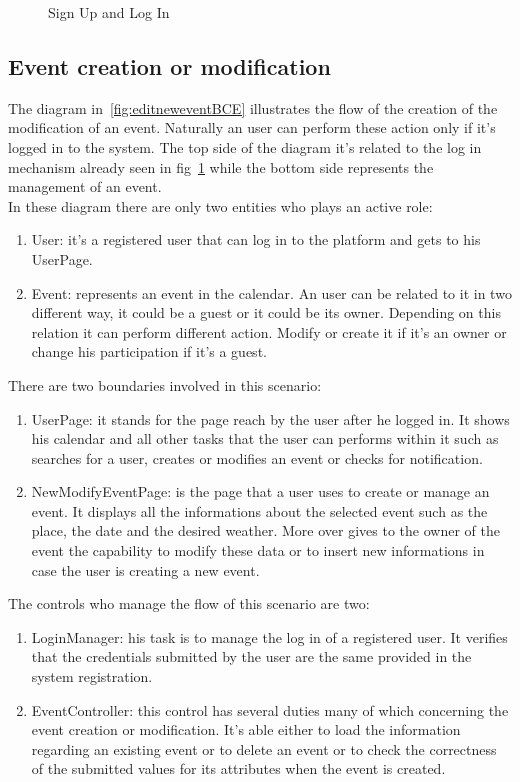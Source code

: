 \begin{itemize}
\begin{center}
\begin{figure}[H]
    \caption{Sign Up and Log In}
     \label{fig:logBCE}
     \end{figure}
   \end{center}  
\end{itemize}

\subsection{Event creation or modification}
The diagram in~\ref{fig:editneweventBCE} illustrates the flow of the creation of the modification of an event. Naturally an user can perform   these action only if it's logged in to the system. The top side of the diagram it's related to the log in mechanism already seen in fig~\ref{fig:logBCE} while the bottom side represents the management of an event. 
\\In these diagram there are only two entities who plays an active role:
\begin{enumerate}
\item User: it's a registered user that can log in to the platform and gets to his UserPage.
\item Event: represents an event in the calendar. An user can be related to it in two different way, it could be a guest or it could be its owner. Depending on this relation it can perform different action. Modify or create it if it's an owner or change his participation if it's a guest.\end{enumerate}
There are two boundaries involved in this scenario: \begin{enumerate}
\item UserPage: it stands for the page reach by the user after he logged in. It shows his calendar and all other tasks that the user can performs within it such as searches for a user, creates or modifies an event or checks for notification.
\item NewModifyEventPage: is the page that a user uses to create or manage an event. It displays all the informations about the selected event such as the place, the date and the desired weather. More over gives to the owner of the event the capability to modify these data or to insert new informations in case the user is creating a new event.
 \end{enumerate}
The controls who manage the flow of this scenario are two:\begin{enumerate}
\item LoginManager: his task is to manage the log in of a registered user. It verifies that the credentials submitted by the user are the same provided in the system registration.   
\item EventController: this control has several duties many of which concerning the event creation or modification. It's able either to load the information regarding an existing event or to delete an event or to check the correctness of the submitted values for its attributes when the event is created.
\end{enumerate}



